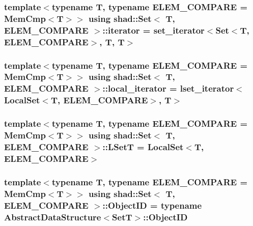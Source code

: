 \hypertarget{classshad_1_1Set_a726ddfe3c1c55db2ef60c5c1960d6666}{
\subsubsection[{iterator}]{\setlength{\rightskip}{0pt plus 5cm}template$<$typename T, typename E\-L\-E\-M\-\_\-\-C\-O\-M\-P\-A\-R\-E = Mem\-Cmp$<$\-T$>$$>$ using {\bf shad\-::\-Set}$<$ T, E\-L\-E\-M\-\_\-\-C\-O\-M\-P\-A\-R\-E $>$\-::{\bf iterator} =  {\bf set\-\_\-iterator}$<${\bf Set}$<$T, E\-L\-E\-M\-\_\-\-C\-O\-M\-P\-A\-R\-E$>$, T, T$>$}}\label{classshad_1_1Set_a726ddfe3c1c55db2ef60c5c1960d6666}
\hypertarget{classshad_1_1Set_a12ce7d6fd8fd0569035b0eb236b22179}{
\subsubsection[{local\-\_\-iterator}]{\setlength{\rightskip}{0pt plus 5cm}template$<$typename T, typename E\-L\-E\-M\-\_\-\-C\-O\-M\-P\-A\-R\-E = Mem\-Cmp$<$\-T$>$$>$ using {\bf shad\-::\-Set}$<$ T, E\-L\-E\-M\-\_\-\-C\-O\-M\-P\-A\-R\-E $>$\-::{\bf local\-\_\-iterator} =  {\bf lset\-\_\-iterator}$<${\bf Local\-Set}$<$T, E\-L\-E\-M\-\_\-\-C\-O\-M\-P\-A\-R\-E$>$, T$>$}}\label{classshad_1_1Set_a12ce7d6fd8fd0569035b0eb236b22179}
\hypertarget{classshad_1_1Set_a93ad50cc28bbc3b48f87e69bfbf3c632}{
\subsubsection[{L\-Set\-T}]{\setlength{\rightskip}{0pt plus 5cm}template$<$typename T, typename E\-L\-E\-M\-\_\-\-C\-O\-M\-P\-A\-R\-E = Mem\-Cmp$<$\-T$>$$>$ using {\bf shad\-::\-Set}$<$ T, E\-L\-E\-M\-\_\-\-C\-O\-M\-P\-A\-R\-E $>$\-::{\bf L\-Set\-T} =  {\bf Local\-Set}$<$T, E\-L\-E\-M\-\_\-\-C\-O\-M\-P\-A\-R\-E$>$}}\label{classshad_1_1Set_a93ad50cc28bbc3b48f87e69bfbf3c632}
\hypertarget{classshad_1_1Set_a05ba25e24c892602d707b21e3e4300b9}{
\subsubsection[{Object\-I\-D}]{\setlength{\rightskip}{0pt plus 5cm}template$<$typename T, typename E\-L\-E\-M\-\_\-\-C\-O\-M\-P\-A\-R\-E = Mem\-Cmp$<$\-T$>$$>$ using {\bf shad\-::\-Set}$<$ T, E\-L\-E\-M\-\_\-\-C\-O\-M\-P\-A\-R\-E $>$\-::{\bf Object\-I\-D} =  typename {\bf Abstract\-Data\-Structure}$<${\bf Set\-T}$>$\-::{\bf Object\-I\-D}}}\label{classshad_1_1Set_a05ba25e24c892602d707b21e3e4300b9}
